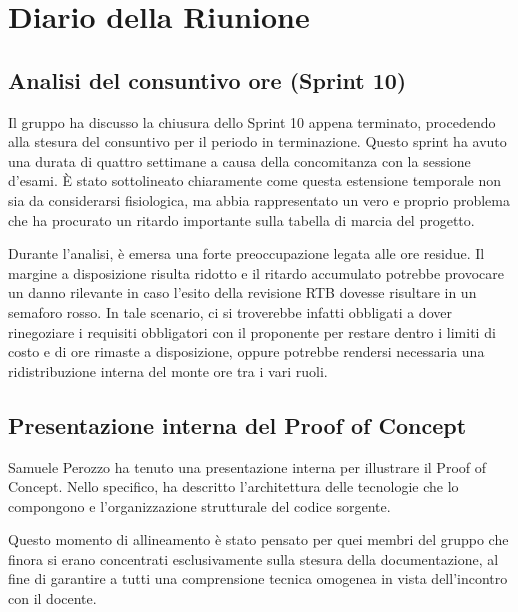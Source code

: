 \documentclass[a4paper, 11pt, oneside]{scrartcl}
\begin{document}

\newpage
\section{Diario della Riunione}

\subsection{Analisi del consuntivo ore (Sprint 10)}

Il gruppo ha discusso la chiusura dello Sprint 10 appena terminato, procedendo alla stesura del consuntivo per il periodo in terminazione. Questo sprint ha avuto una durata di quattro settimane a causa della concomitanza con la sessione d'esami. È stato sottolineato chiaramente come questa estensione temporale non sia da considerarsi fisiologica, ma abbia rappresentato un vero e proprio problema che ha procurato un ritardo importante sulla tabella di marcia del progetto.

Durante l'analisi, è emersa una forte preoccupazione legata alle ore residue. Il margine a disposizione risulta ridotto e il ritardo accumulato potrebbe provocare un danno rilevante in caso l'esito della revisione RTB dovesse risultare in un semaforo rosso. In tale scenario, ci si troverebbe infatti obbligati a dover rinegoziare i requisiti obbligatori con il proponente per restare dentro i limiti di costo e di ore rimaste a disposizione, oppure potrebbe rendersi necessaria una ridistribuzione interna del monte ore tra i vari ruoli.

\subsection{Presentazione interna del Proof of Concept}

Samuele Perozzo ha tenuto una presentazione interna per illustrare il Proof of Concept. Nello specifico, ha descritto l'architettura delle tecnologie che lo compongono e l'organizzazione strutturale del codice sorgente. 

Questo momento di allineamento è stato pensato per quei membri del gruppo che finora si erano concentrati esclusivamente sulla stesura della documentazione, al fine di garantire a tutti una comprensione tecnica omogenea in vista dell'incontro con il docente.

\end{document}

